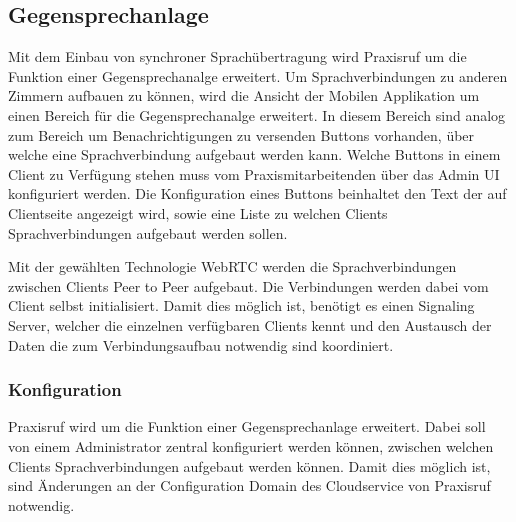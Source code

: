 \subsection{Gegensprechanlage}

Mit dem Einbau von synchroner Sprachübertragung wird Praxisruf um die Funktion einer Gegensprechanalge erweitert.
Um Sprachverbindungen zu anderen Zimmern aufbauen zu können, wird die Ansicht der Mobilen Applikation um einen
Bereich für die Gegensprechanalge erweitert.
In diesem Bereich sind analog zum Bereich um Benachrichtigungen zu versenden Buttons vorhanden, über welche eine
Sprachverbindung aufgebaut werden kann.
Welche Buttons in einem Client zu Verfügung stehen muss vom Praxismitarbeitenden über das Admin UI konfiguriert werden.
Die Konfiguration eines Buttons beinhaltet den Text der auf Clientseite angezeigt wird, sowie eine Liste zu welchen
Clients Sprachverbindungen aufgebaut werden sollen.

Mit der gewählten Technologie WebRTC werden die Sprachverbindungen zwischen Clients Peer to Peer aufgebaut.
Die Verbindungen werden dabei vom Client selbst initialisiert.
Damit dies möglich ist, benötigt es einen Signaling Server, welcher die einzelnen verfügbaren Clients kennt und
den Austausch der Daten die zum Verbindungsaufbau notwendig sind koordiniert.

\clearpage
\subsubsection{Konfiguration}

Praxisruf wird um die Funktion einer Gegensprechanlage erweitert.
Dabei soll von einem Administrator zentral konfiguriert werden können, zwischen welchen Clients Sprachverbindungen
aufgebaut werden können.
Damit dies möglich ist, sind Änderungen an der Configuration Domain des Cloudservice von Praxisruf notwendig.

